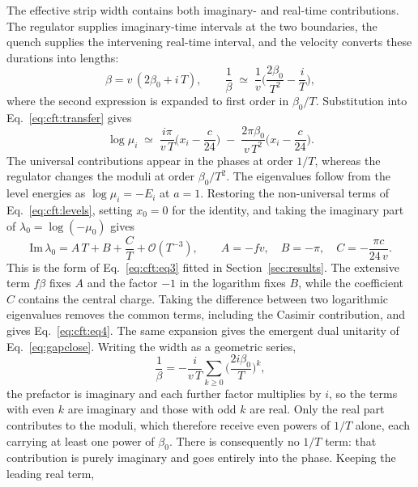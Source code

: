 The effective strip width contains both imaginary- and real-time contributions. The regulator supplies imaginary-time intervals at the two boundaries, the quench supplies the intervening real-time interval, and the velocity converts these durations into lengths:
\begin{equation}
  \beta = v\,(2\beta_0 + i\,T),
  \qquad
  \frac{1}{\beta} \;\simeq\; \frac{1}{v}\Big(\frac{2\beta_0}{T^2} - \frac{i}{T}\Big),
  \label{eq:cft:continuation}
\end{equation}
where the second expression is expanded to first order in $\beta_0/T$. Substitution into Eq.~\eqref{eq:cft:transfer} gives
\begin{equation}
  \log\mu_i \;\simeq\; \frac{i\pi}{v\,T}\Big(x_i-\frac{c}{24}\Big)
  \;-\; \frac{2\pi\beta_0}{v\,T^2}\Big(x_i-\frac{c}{24}\Big).
  \label{eq:cft:contexpand}
\end{equation}
The universal contributions appear in the phases at order $1/T$, whereas the regulator changes the moduli at order $\beta_0/T^2$. The eigenvalues follow from the level energies as $\log\mu_i=-E_i$ at $a=1$. Restoring the non-universal terms of Eq.~\eqref{eq:cft:levels}, setting $x_0=0$ for the identity, and taking the imaginary part of $\lambda_0=\log(-\mu_0)$ gives
\begin{equation}
  \mathrm{Im}\,\lambda_0 = A\,T + B + \frac{C}{T} + \mathcal{O}(T^{-3}),
  \qquad A = -f v, \quad B = -\pi, \quad C = -\frac{\pi c}{24\,v}.
  \label{eq:cft:eq3_derived}
\end{equation}
This is the form of Eq.~\eqref{eq:cft:eq3} fitted in Section~\ref{sec:results}. The extensive term $f\beta$ fixes $A$ and the factor $-1$ in the logarithm fixes $B$, while the coefficient $C$ contains the central charge. Taking the difference between two logarithmic eigenvalues removes the common terms, including the Casimir contribution, and gives Eq.~\eqref{eq:cft:eq4}. The same expansion gives the emergent dual unitarity of Eq.~\eqref{eq:gapclose}. Writing the width as a geometric series,
\begin{equation}
  \frac{1}{\beta} = -\frac{i}{v\,T}\sum_{k\ge0}\Big(\frac{2i\beta_0}{T}\Big)^{k},
  \label{eq:app:betaseries}
\end{equation}
the prefactor is imaginary and each further factor multiplies by $i$, so the terms with even $k$ are imaginary and those with odd $k$ are real. Only the real part contributes to the moduli, which therefore receive even powers of $1/T$ alone, each carrying at least one power of $\beta_0$. There is consequently no $1/T$ term: that contribution is purely imaginary and goes entirely into the phase. Keeping the leading real term,
